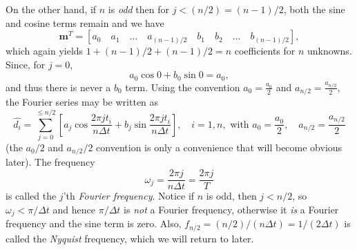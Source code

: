 On the other hand, if $n$ is \emph{odd} then for $j < (n/2) = (n-1)/2$, both the sine and cosine terms remain and we have
\begin{equation}
\mathbf{m}^T = \left[ a_0 \quad a_1 \quad \dots \quad  a_{(n-1)/2} \quad b_1 \quad b_2 \quad  \dots \quad b_{(n-1)/2} \right],
\end{equation}
which again yields $1 + (n-1)/2 + (n-1)/2 = n$ coefficients for $n$ unknowns.  Since, for $j = 0$,
\begin{equation}
a_0 \cos 0 + b_0 \sin 0 = a_0,
\end{equation}
and thus there is never a $b_0$ term.  Using the convention $a_0 = \frac{a_0}{2}$ and $a_{n/2} = \frac{a_{n/2}}{2}$,
the Fourier series may be written as
\begin{equation}
\hat{d_i} = \sum^{ \leq n/2}_{j=0} \left[a_j \cos \frac{2 \pi jt_i}{n \Delta t} + b_j \sin \frac {2 \pi j t_i}{n \Delta t} \right],\quad i = 1,n,\mbox{ with } a_0 = \frac{a_0}{2},\quad a_{n/2} = \frac{a_{n/2}}{2}
\end{equation}	 	
(the $a_{0}/2$ and $a_{n/2}/2$ convention is only a convenience that will become obvious later).  The frequency
\begin{equation}
\omega_j = \frac{2 \pi j}{n \Delta t} = \frac{2 \pi j}{T} 
\end{equation}
is called the $j$'th \emph{Fourier frequency}.  Notice if $n$ is odd, then $j < n/2$, so $\omega_j < \pi/\Delta t$ and hence $\pi/\Delta t$ is \emph{not}
a Fourier frequency, otherwise it \emph{is} a 
Fourier frequency and the sine term is zero.  Also, $f_{n/2} = (n/2)/ (n \Delta t) = 1/(2 \Delta t)$ is called the \emph{Nyquist} 
frequency, which we will return to later.
	
